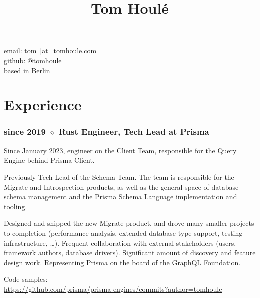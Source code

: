 \documentclass[10pt]{article}
\date{}
\title{Tom Houlé}
\author{}
\newcommand{\setparskip}{\setlength{\parskip}{.3em}}
\begin{document}
\maketitle

\vspace{-14mm}

\begin{center}
email: tom~[at]~tomhoule.com \\
github: \href{https://github.com/tomhoule}{@tomhoule} \\
based in Berlin
\end{center}

\vspace{10mm}

\begin{minipage}[t]{0.54\textwidth}
  \setparskip

  \section*{Experience}

  \subsubsection*{since 2019 $\diamond$ Rust Engineer, Tech Lead at Prisma}

    \vspace{-0.8em}

    Since January 2023, engineer on the Client Team, responsible for the Query
    Engine behind Prisma Client.

    Previously Tech Lead of the Schema Team. The team is responsible for the Migrate
    and Introspection products, as well as the general space of database schema
    management and the Prisma Schema Language implementation and tooling.

    Designed and shipped the new Migrate product, and drove many smaller
    projects to completion (performance analysis, extended database type
    support, testing infrastructure, …). Frequent collaboration with external
    stakeholders (users, framework authors, database drivers). Significant
    amount of discovery and feature design work. Representing Prisma on the
    board of the GraphQL Foundation.

    Code samples: \\
    \url{https://github.com/prisma/prisma-engines/commits?author=tomhoule}

    \vspace{-0.5em}


\end{minipage}
\end{document}
